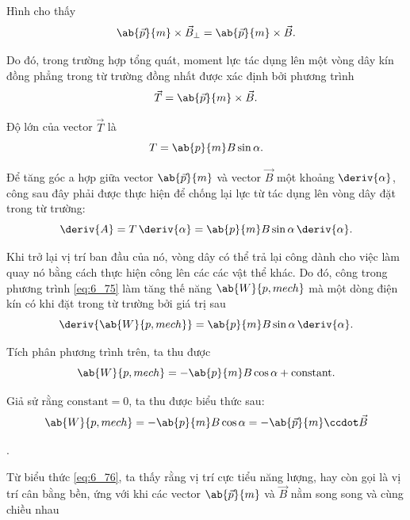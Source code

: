 \noindent
Hình  cho thấy
\begin{equation*}
    \ab{\vec{p}}{m} \times \vec{B}_{\perp} = \ab{\vec{p}}{m} \times \vec{B}.
\end{equation*}

\noindent
Do đó, trong trường hợp tổng quát, moment lực tác dụng lên một vòng dây kín đồng phẳng trong từ trường đồng nhất được xác định bởi phương trình \begin{equation}\label{eq:6_73}
    \vec{T} = \ab{\vec{p}}{m} \times \vec{B}.
\end{equation}

\noindent
Độ lớn của vector $\vec{T}$ là
\begin{equation}\label{eq:6_74}
    T = \ab{p}{m} B \sin\alpha.
\end{equation}

Để tăng góc a hợp giữa vector $\ab{\vec{p}}{m}$ và vector $\vec{B}$ một khoảng $\deriv{\alpha}$, công sau đây phải được thực hiện để chống lại lực từ tác dụng lên vòng dây đặt trong từ trường:
\begin{equation}\label{eq:6_75}
    \deriv{A} = T\, \deriv{\alpha} = \ab{p}{m} B \sin\alpha\, \deriv{\alpha}.
\end{equation}

\noindent
Khi trở lại vị trí ban đầu của nó, vòng dây có thể trả lại công dành cho việc làm quay nó bằng cách thực hiện công lên các các vật thể khác. Do đó, công trong phương trình \eqref{eq:6_75} làm tăng thế năng $\ab{W}{p,mech}$ mà một dòng điện kín có khi đặt trong từ trường bởi giá trị sau
\begin{equation*}
    \deriv{\ab{W}{p,mech}} = \ab{p}{m} B \sin\alpha\, \deriv{\alpha}.
\end{equation*}

\noindent
Tích phân phương trình trên, ta thu được
\begin{equation*}
    \ab{W}{p,mech} = - \ab{p}{m} B \cos\alpha + \text{constant}.
\end{equation*}

\noindent
Giả sử rằng $\text{constant}=0$, ta thu được biểu thức sau:
\begin{equation}\label{eq:6_76}
    \ab{W}{p,mech} = - \ab{p}{m} B \cos\alpha = - \ab{\vec{p}}{m} \ccdot \vec{B}
\end{equation}

.

Từ biểu thức \eqref{eq:6_76}, ta thấy rằng vị trí cực tiểu năng lượng, hay còn gọi là vị trí cân bằng bền, ứng với khi các vector $\ab{\vec{p}}{m}$ và $\vec{B}$ nằm song song và cùng chiều nhau

